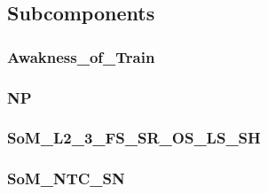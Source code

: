 \subsection{Subcomponents}\label{s:etcs_procedures_subcomponents}

\subsubsection{Awakness\_of\_Train}


\subsubsection{NP}


\subsubsection{SoM\_L2\_3\_FS\_SR\_OS\_LS\_SH}


\subsubsection{SoM\_NTC\_SN}



